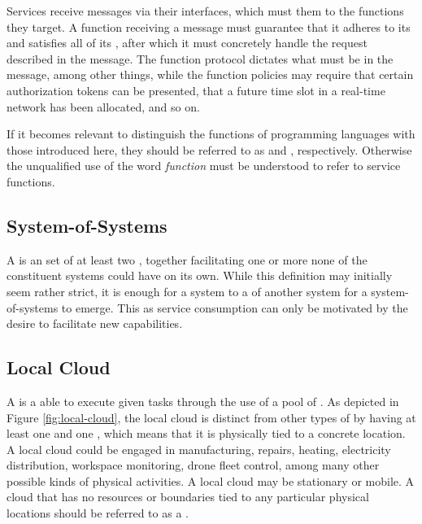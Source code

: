 Services receive messages via their interfaces, which must  them to the functions they target.
A function receiving a message must guarantee that it adheres to its  and satisfies all of its , after which it must concretely handle the request described in the message.
The function protocol dictates what  must be in the message, among other things, while the function policies may require that certain authorization tokens can be presented, that a future time slot in a real-time network has been allocated, and so on.

If it becomes relevant to distinguish the functions of programming languages with those introduced here, they should be referred to as  and , respectively.
Otherwise the unqualified use of the word \textit{function} must be understood to refer to service functions.

\subsection{System-of-Systems}
\label{sec:concepts:sos}

A  is an  set of at least two , together facilitating one or more  none of the constituent systems could have on its own.
While this definition may initially seem rather strict, it is enough for a system to  a  of another system for a system-of-systems to emerge.
This as service consumption can only be motivated by the desire to facilitate new capabilities.

\subsection{Local Cloud}
\label{sec:concepts:local-cloud}

A  is a  able to execute given tasks through the use of a pool of .
As depicted in Figure \ref{fig:local-cloud}, the local cloud is distinct from other types of  by having at least one  and one , which means that it is physically tied to a concrete location.
A local cloud could be engaged in manufacturing, repairs, heating, electricity distribution, workspace monitoring, drone fleet control, among many other possible kinds of physical activities.
A local cloud may be stationary or mobile.
A cloud that has no resources or boundaries tied to any particular physical locations should be referred to as a .

